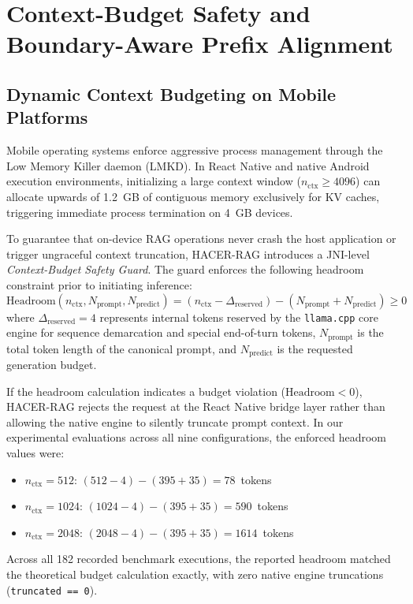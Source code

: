 \section{Context-Budget Safety and Boundary-Aware Prefix Alignment}
\label{sec:context_safety}

\subsection{Dynamic Context Budgeting on Mobile Platforms}
Mobile operating systems enforce aggressive process management through the Low Memory Killer daemon (LMKD). In React Native and native Android execution environments, initializing a large context window ($n_{\text{ctx}} \ge 4096$) can allocate upwards of 1.2~GB of contiguous memory exclusively for KV caches, triggering immediate process termination on 4~GB devices.

To guarantee that on-device RAG operations never crash the host application or trigger ungraceful context truncation, HACER-RAG introduces a JNI-level \emph{Context-Budget Safety Guard}. The guard enforces the following headroom constraint prior to initiating inference:
\begin{equation}
    \text{Headroom}(n_{\text{ctx}}, N_{\text{prompt}}, N_{\text{predict}}) = (n_{\text{ctx}} - \Delta_{\text{reserved}}) - (N_{\text{prompt}} + N_{\text{predict}}) \ge 0
    \label{eq:headroom}
\end{equation}
where $\Delta_{\text{reserved}} = 4$ represents internal tokens reserved by the \texttt{llama.cpp} core engine for sequence demarcation and special end-of-turn tokens, $N_{\text{prompt}}$ is the total token length of the canonical prompt, and $N_{\text{predict}}$ is the requested generation budget.

If the headroom calculation indicates a budget violation ($\text{Headroom} < 0$), HACER-RAG rejects the request at the React Native bridge layer rather than allowing the native engine to silently truncate prompt context. In our experimental evaluations across all nine configurations, the enforced headroom values were:
\begin{itemize}
    \item $n_{\text{ctx}} = 512$: $(512 - 4) - (395 + 35) = 78$~tokens
    \item $n_{\text{ctx}} = 1024$: $(1024 - 4) - (395 + 35) = 590$~tokens
    \item $n_{\text{ctx}} = 2048$: $(2048 - 4) - (395 + 35) = 1614$~tokens
\end{itemize}
Across all 182 recorded benchmark executions, the reported headroom matched the theoretical budget calculation exactly, with zero native engine truncations (\texttt{truncated == 0}).

